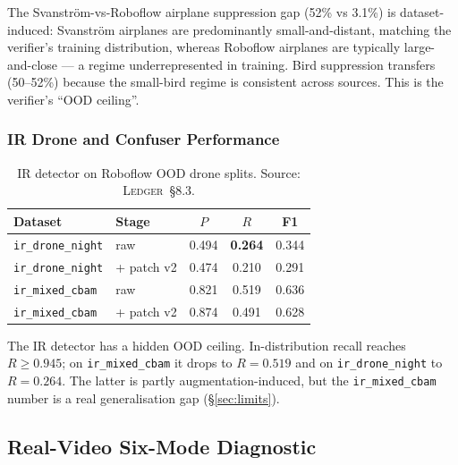 The Svanstr\"om-vs-Roboflow airplane suppression gap (52\% vs 3.1\%) is dataset-induced: Svanstr\"om airplanes are predominantly small-and-distant, matching the verifier's training distribution, whereas Roboflow airplanes are typically large-and-close --- a regime underrepresented in training. Bird suppression transfers (50--52\%) because the small-bird regime is consistent across sources. This is the verifier's ``OOD ceiling''.

\subsubsection{IR Drone and Confuser Performance}

\begin{table}[htbp]
    \centering
    \caption{IR detector on Roboflow OOD drone splits. Source: \textsc{Ledger}~\S8.3.}
    \label{tab:ood_ir}
    \begin{tabular}{llccc}
        \toprule
        Dataset & Stage & $P$ & $R$ & F1 \\
        \midrule
        \texttt{ir\_drone\_night} & raw & 0.494 & \textbf{0.264} & 0.344 \\
        \texttt{ir\_drone\_night} & + patch v2 & 0.474 & 0.210 & 0.291 \\
        \texttt{ir\_mixed\_cbam}  & raw & 0.821 & 0.519 & 0.636 \\
        \texttt{ir\_mixed\_cbam}  & + patch v2 & 0.874 & 0.491 & 0.628 \\
        \bottomrule
    \end{tabular}
\end{table}

The IR detector has a hidden OOD ceiling. In-distribution recall reaches $R \geq 0.945$; on \texttt{ir\_mixed\_cbam} it drops to $R=0.519$ and on \texttt{ir\_drone\_night} to $R=0.264$. The latter is partly augmentation-induced, but the \texttt{ir\_mixed\_cbam} number is a real generalisation gap (\S\ref{sec:limits}).

\subsection{Real-Video Six-Mode Diagnostic}
\label{sec:realvideo}

